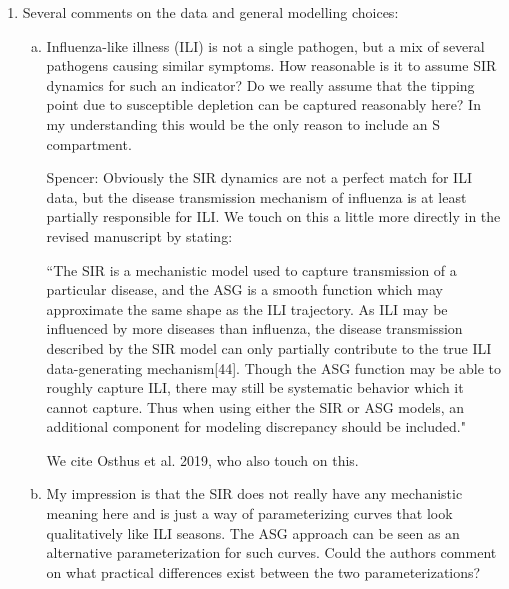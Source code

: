\documentclass{article}
\newcommand{\spencer}[1]{{\color{blue} Spencer: #1}}
\begin{document}
\begin{enumerate}[1.]
\begin{enumerate}[a.]
\item Also, it should be argued explicitly why this approach was chosen over a standard fully
Bayesian approach in the setting at hand. Was a fully Bayesian approach also explored? Which
difficulties were encountered?

\spencer{See response to comment 1b.}

\item Notably it would be helpful to comment on how this approach affects the uncertainty
propagation / overall quantification of forecast uncertainty.

\spencer{See response to comment 1b.}

\end{enumerate}


\item Several comments on the data and general modelling choices:

\begin{enumerate}[a.]
\item Influenza-like illness (ILI) is not a single pathogen, but a mix of several pathogens causing
similar symptoms. How reasonable is it to assume SIR dynamics for such an indicator? Do we
really assume that the tipping point due to susceptible depletion can be captured reasonably here? In
my understanding this would be the only reason to include an S compartment.

\spencer{Obviously the SIR dynamics are not a perfect match for ILI data, but
the disease transmission mechanism of influenza is at least partially 
responsible for ILI. We touch on this a little more directly in the revised 
manuscript by stating:

``The SIR is a mechanistic model used to capture transmission of a particular
disease, and the ASG is a smooth function which may approximate the 
same shape as the ILI trajectory. As ILI may be influenced by more 
diseases than influenza, the disease transmission described by the SIR model
can only partially contribute to the true ILI data-generating mechanism[44].
Though the ASG function may be able to roughly capture ILI, there may still be 
systematic behavior which it cannot capture. Thus when using either the SIR
or ASG models, an additional component for modeling discrepancy should be 
included."

We cite Osthus et al. 2019, who also touch on this.}


\item My impression is that the SIR does not really have any mechanistic meaning here and is just a
way of parameterizing curves that look qualitatively like ILI seasons. The ASG approach can be
seen as an alternative parameterization for such curves. Could the authors comment on what
practical differences exist between the two parameterizations?


\end{enumerate}
\end{enumerate}
\end{document}
